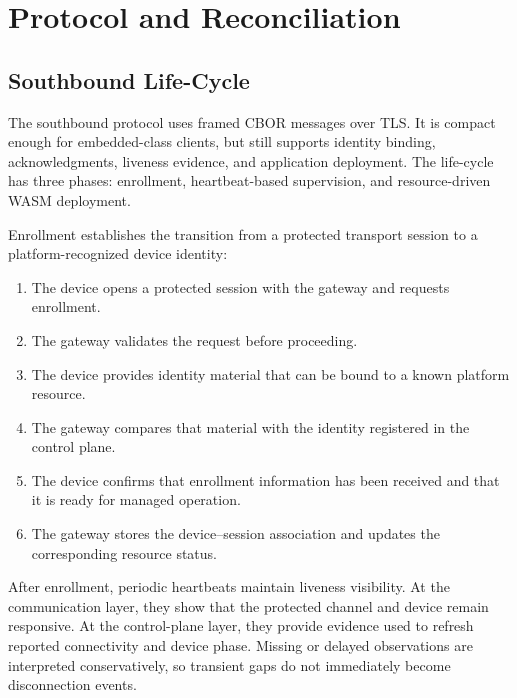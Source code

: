 \section{Protocol and Reconciliation}\label{sec:protocol}

\subsection{Southbound Life-Cycle}
The southbound protocol uses framed CBOR messages over TLS. It is compact enough for embedded-class clients, but still supports identity binding, acknowledgments, liveness evidence, and application deployment. The life-cycle has three phases: enrollment, heartbeat-based supervision, and resource-driven WASM deployment.

Enrollment establishes the transition from a protected transport session to a platform-recognized device identity:
\begin{enumerate}
    \item The device opens a protected session with the gateway and requests enrollment.
    \item The gateway validates the request before proceeding.
    \item The device provides identity material that can be bound to a known platform resource.
    \item The gateway compares that material with the identity registered in the control plane.
    \item The device confirms that enrollment information has been received and that it is ready for managed operation.
    \item The gateway stores the device--session association and updates the corresponding resource status.
\end{enumerate}

After enrollment, periodic heartbeats maintain liveness visibility. At the communication layer, they show that the protected channel and device remain responsive. At the control-plane layer, they provide evidence used to refresh reported connectivity and device phase. Missing or delayed observations are interpreted conservatively, so transient gaps do not immediately become disconnection events.

